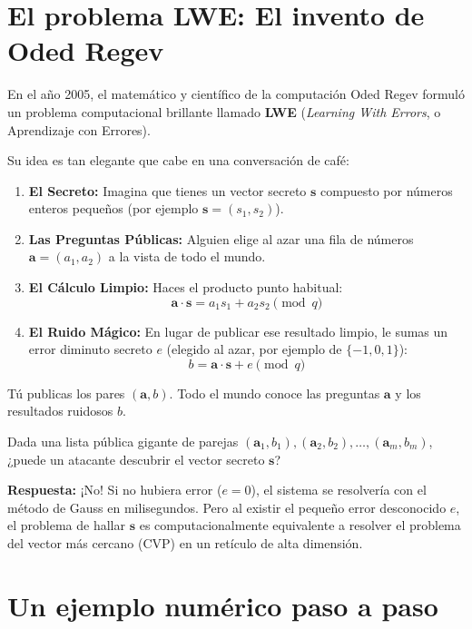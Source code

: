 \section{El problema LWE: El invento de Oded Regev}

En el año 2005, el matemático y científico de la computación Oded Regev formuló un problema computacional brillante llamado \textbf{LWE} (\textit{Learning With Errors}, o Aprendizaje con Errores). 

Su idea es tan elegante que cabe en una conversación de café:

\begin{intuicion}
\begin{enumerate}
  \item \textbf{El Secreto:} Imagina que tienes un vector secreto $\mathbf{s}$ compuesto por números enteros pequeños (por ejemplo $\mathbf{s} = (s_1, s_2)$).
  \item \textbf{Las Preguntas Públicas:} Alguien elige al azar una fila de números $\mathbf{a} = (a_1, a_2)$ a la vista de todo el mundo.
  \item \textbf{El Cálculo Limpio:} Haces el producto punto habitual:
  \[
  \mathbf{a} \cdot \mathbf{s} = a_1 s_1 + a_2 s_2 \pmod q
  \]
  \item \textbf{El Ruido Mágico:} En lugar de publicar ese resultado limpio, le sumas un error diminuto secreto $e$ (elegido al azar, por ejemplo de $\{-1, 0, 1\}$):
  \[
  b = \mathbf{a} \cdot \mathbf{s} + e \pmod q
  \]
\end{enumerate}
\end{intuicion}

Tú publicas los pares $(\mathbf{a}, b)$. Todo el mundo conoce las preguntas $\mathbf{a}$ y los resultados ruidosos $b$. 

\begin{ojo}
Dada una lista pública gigante de parejas $(\mathbf{a}_1, b_1), (\mathbf{a}_2, b_2), \dots, (\mathbf{a}_m, b_m)$, ¿puede un atacante descubrir el vector secreto $\mathbf{s}$?

\textbf{Respuesta:} ¡No! Si no hubiera error ($e=0$), el sistema se resolvería con el método de Gauss en milisegundos. Pero al existir el pequeño error desconocido $e$, el problema de hallar $\mathbf{s}$ es computacionalmente equivalente a resolver el problema del vector más cercano (CVP) en un retículo de alta dimensión.
\end{ojo}

\section{Un ejemplo numérico paso a paso}


